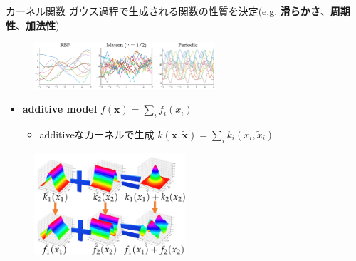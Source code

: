 \begin{frame}{カーネル関数}
ガウス過程で生成される関数の性質を決定(e.g. \textbf{滑らかさ}、\textbf{周期性}、\textbf{加法性})
\begin{figure}
  \includegraphics[width=0.6\textwidth]{figs/kernel_comparison.pdf}
\end{figure}
\begin{itemize}
  \item \textbf{additive model} $f(\bm{x})=\sum_{i}f_{i}(x_{i})$
  \begin{itemize}
    \item additiveなカーネルで生成 $k(\bm{x},\bm{\tilde{x}})=\sum_{i}k_{i}(x_{i},\tilde{x}_{i})$
  \end{itemize}
\end{itemize}
\begin{figure}
  \centering
  \includegraphics[width=0.5\textwidth]{figs/additive_gp.pdf}
\end{figure}
\end{frame}

